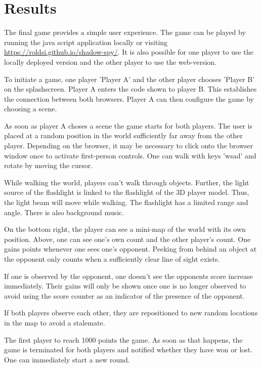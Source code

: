 \documentclass[11pt]{article}
\begin{document}
\section{Results}
\par The final game provides a simple user experience. The game can be played by running the java script application locally or visiting \href{https://google.com}{https://roldsi.github.io/shadow-spy/}. It is also possible for one player to use the locally deployed version and the other player to use the web-version.
\par To initiate a game, one player 'Player A' and the other player chooses 'Player B' on the splashscreen. Player A enters the code shown to player B. This establishes the connection between both browsers. Player A can then configure the game by choosing a scene.
\par As soon as player A choses a scene the game starts for both players. The user is placed at a random position in the world sufficiently far away from the other player. Depending on the browser, it may be necessary to click onto the browser window once to activate first-person controls. One can walk with keys 'wsad' and rotate by moving the cursor.
\par While walking the world, players can't walk through objects. Further, the light source of the flashlight is linked to the flashlight of the 3D player model. Thus, the light beam will move while walking. The flashlight has a limited range and angle.
There is also background music.
\par On the bottom right, the player can see a mini-map of the world with its own position. Above, one can see one's own count and the other player's count. One gains points whenever one sees one's opponent. Peeking from behind an object at the opponent only counts when a sufficiently clear line of sight exists.
\par If one is observed by the opponent, one doesn't see the opponents score increase immediately. Their gains will only be shown once one is no longer observed to avoid using the score counter as an indicator of the presence of the opponent.
\par If both players observe each other, they are repositioned to new random locations in the map to avoid a stalemate.
\par The first player to reach 1000 points the game. As soon as that happens, the game is terminated for both players and notified whether they have won or lost. One can immediately start a new round.
\end{document}
